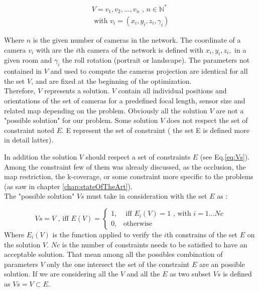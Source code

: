 \begin{equation}\label{eq:V}
		\begin{split}
			V= {v_1,v_2,...,v_n} \mbox{  , } n\in \mathbb{N}^*
				\\
			\mbox{ with } v_i= (x_i,y_i,z_i,\gamma_i)
		\end{split}
	\end{equation}
	
\noindent Where $n$ is the given number of cameras in the network. The coordinate of a camera $v_i$ with are the $i$th camera of the network is defined  with $x_i, y_i, z_i,$ in a given room and $\gamma_i$ the roll rotation (portrait or landscape). The parameters not contained in $V$ and used to compute the cameras projection are  identical for all the set $V$, and are fixed at the beginning of the optimization.\\
Therefore, $V$ represents a solution. $V$ contain all individual positions and orientations of the set of cameras for a predefined focal length, sensor size and related map depending on the problem.%
 Obviously all the solution $V$ are not a "possible solution" for our problem. Some solution $V$ does not respect the set of constraint noted $E$. E represent the set of constraint ( the set E is defined  more in detail latter). 

In addition the solution $V$ should respect a set of constraints  $E$ (see Eq.\ref{eq:Vs}). Among the constraint few of them was already discussed, as the occlusion, the map restriction, the k-coverage, or some constraint more specific to the problems (as saw in chapter \ref{chap:stateOfTheArt}).\\
 The "possible solution" $Vs$ must take in consideration with the set $E$ as :

\begin{equation}\label{eq:Vs}
Vs=V \mbox{ , iff } E(V)=\begin{cases} 1, & \mbox{  iff } E_i(V)=1 \mbox{ , with } i=1...Nc \\ 0, & \mbox{otherwise} 
\end{cases} 
\end{equation}
Where $E_i(V)$ is the function applied to verify  the $i$th constrains of the set $E$ on the solution $V$. $Nc$ is the number of constraints needs to be satisfied to have an acceptable solution.
That mean among all the possibles combination of parameters $V$ only the one intersect the set of the constraint $E$ are an possible solution.  If we are considering  all the $V$ and all the $E$ as two subset $Vs$ is defined as $Vs=V\subset E$. 

